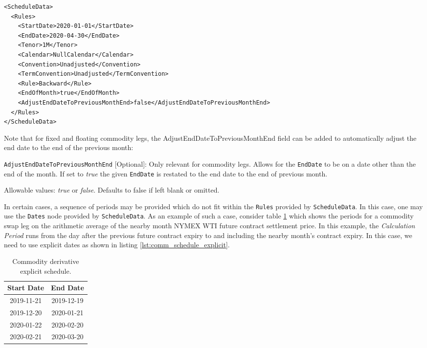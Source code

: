 \begin{listing}[h!]
\begin{verbatim}
<ScheduleData>
  <Rules>
    <StartDate>2020-01-01</StartDate>
    <EndDate>2020-04-30</EndDate>
    <Tenor>1M</Tenor>
    <Calendar>NullCalendar</Calendar>
    <Convention>Unadjusted</Convention>
    <TermConvention>Unadjusted</TermConvention>
    <Rule>Backward</Rule>
    <EndOfMonth>true</EndOfMonth>
    <AdjustEndDateToPreviousMonthEnd>false</AdjustEndDateToPreviousMonthEnd>
  </Rules>
</ScheduleData>
\end{verbatim}
\caption{\textnormal{\lstinline!ScheduleData!} node for monthly periods.}
\label{lst:comm_schedule_monthly}
\end{listing}

Note that for fixed and floating commodity legs, the AdjustEndDateToPreviousMonthEnd field can be added to automatically adjust the end date to the end of the previous month:

\lstinline!AdjustEndDateToPreviousMonthEnd! [Optional]: Only relevant for commodity legs. Allows for the \lstinline!EndDate! to be on a date other than the end of the month. If set to \emph{true} the given \lstinline!EndDate! is restated to the end date to the end of previous month.

Allowable values: \emph{true} or \emph{false}. Defaults to false if left blank or omitted.

In certain cases, a sequence of periods may be provided which do not fit within the \lstinline!Rules! provided by \lstinline!ScheduleData!. In this case, one may use the \lstinline!Dates! node provided by \lstinline!ScheduleData!. As an example of such a case, consider table \ref{tab:comm_schedule_explicit} which shows the periods for a commodity swap leg on the arithmetic average of the nearby month NYMEX WTI future contract settlement price. In this example, the \textit{Calculation Period} runs from the day after the previous future contract expiry to and including the nearby month's contract expiry. In this case, we need to use explicit dates as shown in listing \ref{lst:comm_schedule_explicit}.

\begin{table}[h!]
\centering
  \begin{tabular}{|c|c|}
  \hline
  Start Date & End Date \\
  \hline
  2019-11-21 & 2019-12-19 \\
  2019-12-20 & 2020-01-21 \\
  2020-01-22 & 2020-02-20 \\
  2020-02-21 & 2020-03-20 \\
  \hline
  \end{tabular}
\caption{Commodity derivative explicit schedule.}
\label{tab:comm_schedule_explicit}
\end{table}

